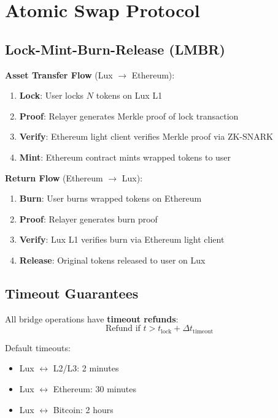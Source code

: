 \documentclass[11pt]{article}
\begin{document}
\section{Atomic Swap Protocol}

\subsection{Lock-Mint-Burn-Release (LMBR)}

\textbf{Asset Transfer Flow} (Lux $\to$ Ethereum):

\begin{enumerate}
  \item \textbf{Lock}: User locks $N$ tokens on Lux L1
  \item \textbf{Proof}: Relayer generates Merkle proof of lock transaction
  \item \textbf{Verify}: Ethereum light client verifies Merkle proof via ZK-SNARK
  \item \textbf{Mint}: Ethereum contract mints wrapped tokens to user
\end{enumerate}

\textbf{Return Flow} (Ethereum $\to$ Lux):
\begin{enumerate}
  \item \textbf{Burn}: User burns wrapped tokens on Ethereum
  \item \textbf{Proof}: Relayer generates burn proof
  \item \textbf{Verify}: Lux L1 verifies burn via Ethereum light client
  \item \textbf{Release}: Original tokens released to user on Lux
\end{enumerate}

\subsection{Timeout Guarantees}

All bridge operations have \textbf{timeout refunds}:
\begin{equation}
\text{Refund if } t > t_{\text{lock}} + \Delta t_{\text{timeout}}
\end{equation}

Default timeouts:
\begin{itemize}[leftmargin=1.1em]
  \item Lux $\leftrightarrow$ L2/L3: 2 minutes
  \item Lux $\leftrightarrow$ Ethereum: 30 minutes
  \item Lux $\leftrightarrow$ Bitcoin: 2 hours
\end{itemize}
\end{document}
